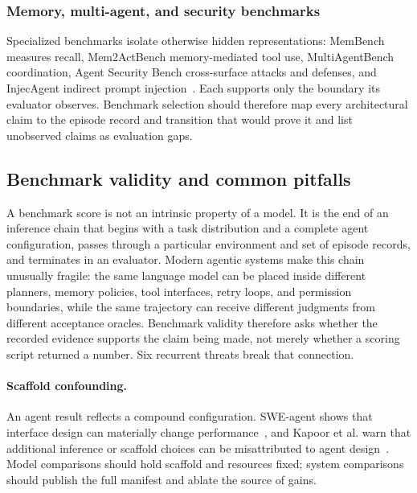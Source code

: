 \subsubsection{Memory, multi-agent, and security benchmarks}

Specialized benchmarks isolate otherwise hidden representations: MemBench measures recall, Mem2ActBench memory-mediated tool use, MultiAgentBench coordination, Agent Security Bench cross-surface attacks and defenses, and InjecAgent indirect prompt injection~\cite{tan2025membench,shen2026mem2actbench,zhu2025multiagentbench,zhang2024agentsecuritybench,zhan2024injecagent}. Each supports only the boundary its evaluator observes. Benchmark selection should therefore map every architectural claim to the episode record and transition that would prove it and list unobserved claims as evaluation gaps.

\subsection{Benchmark validity and common pitfalls}

A benchmark score is not an intrinsic property of a model. It is the end of an inference chain that begins with a task distribution and a complete agent configuration, passes through a particular environment and set of episode records, and terminates in an evaluator. Modern agentic systems make this chain unusually fragile: the same language model can be placed inside different planners, memory policies, tool interfaces, retry loops, and permission boundaries, while the same trajectory can receive different judgments from different acceptance oracles. Benchmark validity therefore asks whether the recorded evidence supports the claim being made, not merely whether a scoring script returned a number. Six recurrent threats break that connection.

\paragraph{Scaffold confounding.}
An agent result reflects a compound configuration. SWE-agent shows that interface design can materially change performance~\cite{yang2024sweagent}, and Kapoor et al. warn that additional inference or scaffold choices can be misattributed to agent design~\cite{kapoor2025agentsmatter}. Model comparisons should hold scaffold and resources fixed; system comparisons should publish the full manifest and ablate the source of gains.


